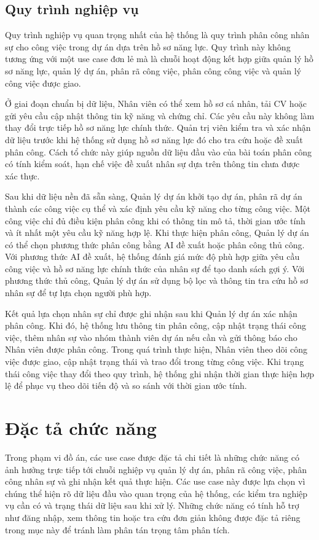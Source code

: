 \documentclass[../DoAn.tex]{subfiles}
\begin{document}
\subsection{Quy trình nghiệp vụ}
\label{subsection:2.2.9}
Quy trình nghiệp vụ quan trọng nhất của hệ thống là quy trình phân công nhân sự cho công việc trong dự án dựa trên hồ sơ năng lực. Quy trình này không tương ứng với một use case đơn lẻ mà là chuỗi hoạt động kết hợp giữa quản lý hồ sơ năng lực, quản lý dự án, phân rã công việc, phân công công việc và quản lý công việc được giao.

Ở giai đoạn chuẩn bị dữ liệu, Nhân viên có thể xem hồ sơ cá nhân, tải CV hoặc gửi yêu cầu cập nhật thông tin kỹ năng và chứng chỉ. Các yêu cầu này không làm thay đổi trực tiếp hồ sơ năng lực chính thức. Quản trị viên kiểm tra và xác nhận dữ liệu trước khi hệ thống sử dụng hồ sơ năng lực đó cho tra cứu hoặc đề xuất phân công. Cách tổ chức này giúp nguồn dữ liệu đầu vào của bài toán phân công có tính kiểm soát, hạn chế việc đề xuất nhân sự dựa trên thông tin chưa được xác thực.

Sau khi dữ liệu nền đã sẵn sàng, Quản lý dự án khởi tạo dự án, phân rã dự án thành các công việc cụ thể và xác định yêu cầu kỹ năng cho từng công việc. Một công việc chỉ đủ điều kiện phân công khi có thông tin mô tả, thời gian ước tính và ít nhất một yêu cầu kỹ năng hợp lệ. Khi thực hiện phân công, Quản lý dự án có thể chọn phương thức phân công bằng AI đề xuất hoặc phân công thủ công. Với phương thức AI đề xuất, hệ thống đánh giá mức độ phù hợp giữa yêu cầu công việc và hồ sơ năng lực chính thức của nhân sự để tạo danh sách gợi ý. Với phương thức thủ công, Quản lý dự án sử dụng bộ lọc và thông tin tra cứu hồ sơ nhân sự để tự lựa chọn người phù hợp.

Kết quả lựa chọn nhân sự chỉ được ghi nhận sau khi Quản lý dự án xác nhận phân công. Khi đó, hệ thống lưu thông tin phân công, cập nhật trạng thái công việc, thêm nhân sự vào nhóm thành viên dự án nếu cần và gửi thông báo cho Nhân viên được phân công. Trong quá trình thực hiện, Nhân viên theo dõi công việc được giao, cập nhật trạng thái và trao đổi trong từng công việc. Khi trạng thái công việc thay đổi theo quy trình, hệ thống ghi nhận thời gian thực hiện hợp lệ để phục vụ theo dõi tiến độ và so sánh với thời gian ước tính.
\section{Đặc tả chức năng}
\label{section:2.3}
Trong phạm vi đồ án, các use case được đặc tả chi tiết là những chức năng có ảnh hưởng trực tiếp tới chuỗi nghiệp vụ quản lý dự án, phân rã công việc, phân công nhân sự và ghi nhận kết quả thực hiện. Các use case này được lựa chọn vì chúng thể hiện rõ dữ liệu đầu vào quan trọng của hệ thống, các kiểm tra nghiệp vụ cần có và trạng thái dữ liệu sau khi xử lý. Những chức năng có tính hỗ trợ như đăng nhập, xem thông tin hoặc tra cứu đơn giản không được đặc tả riêng trong mục này để tránh làm phân tán trọng tâm phân tích.
\end{document}
